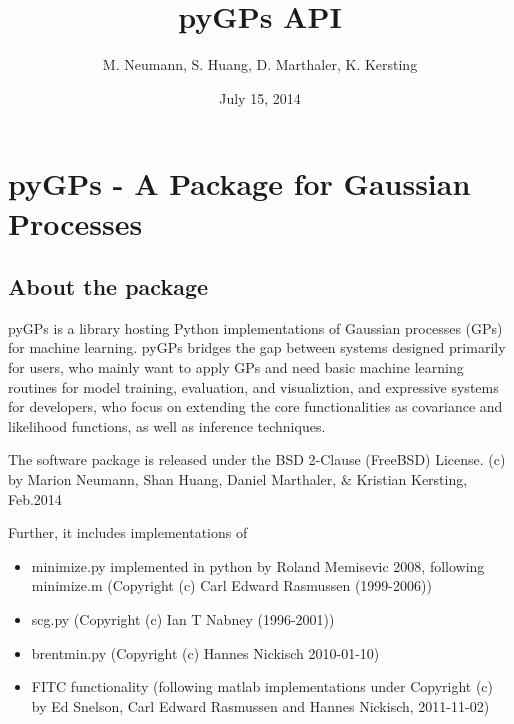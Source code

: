 \documentclass[letterpaper,10pt,english]{sphinxmanual}
\title{pyGPs API}
\date{July 15, 2014}
\author{M. Neumann, S. Huang, D. Marthaler, K. Kersting}
\begin{document}
\maketitle
\tableofcontents
{}\label{index::doc}



\chapter{pyGPs - A Package for Gaussian Processes}
\label{index:pygps-a-package-for-gaussian-processes}\label{index:welcome-to-pygps-s-api}

\section{About the package}
\label{index:about-the-package}
pyGPs is a library hosting Python implementations of Gaussian processes (GPs) for
machine learning.
pyGPs bridges the gap between systems designed primarily for users, who mainly
want to apply GPs and need basic machine learning routines for model training, evaluation, and
visualiztion, and expressive systems for developers, who focus on extending the core
functionalities as covariance and likelihood functions, as well as inference techniques.

The software package is released under the BSD 2-Clause (FreeBSD) License.
 (c) by
Marion Neumann, Shan Huang, Daniel Marthaler, \& Kristian Kersting, Feb.2014

Further, it includes implementations of
\begin{itemize}
\item {} 
minimize.py implemented in python by Roland Memisevic 2008, following minimize.m (Copyright (c) Carl Edward Rasmussen (1999-2006))

\item {} 
scg.py (Copyright (c) Ian T Nabney (1996-2001))

\item {} 
brentmin.py (Copyright (c) Hannes Nickisch 2010-01-10)

\item {} 
FITC functionality (following matlab implementations under Copyright (c) by Ed Snelson, Carl Edward Rasmussen and Hannes Nickisch, 2011-11-02)

\end{itemize}
\end{document}
